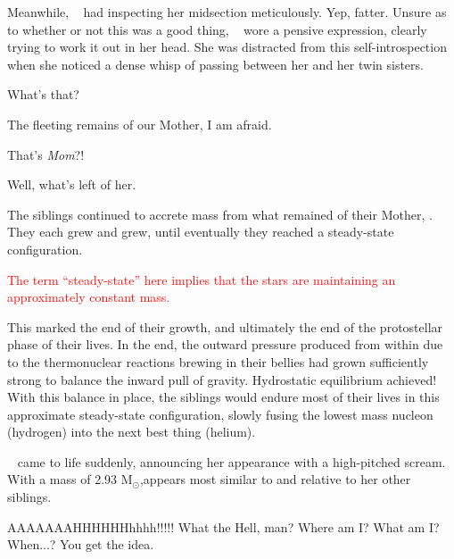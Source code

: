 \documentclass[main.tex]{subfiles}
\begin{document}
\par \nar Meanwhile, \rmcelaeno~ had inspecting her midsection meticulously.  Yep, fatter.  Unsure as to whether or not this was a good thing, \rmcelaeno~ wore a pensive expression, clearly trying to work it out in her head.  She was distracted from this self-introspection when she noticed a dense whisp of \Pleione passing between her and her twin sisters.  

\par \Celaeno What's that?

\par \Maia The fleeting remains of our Mother, I am afraid.

\par \Electra That's \textit{Mom}?!

\par \Maia Well, what's left of her.

\par \nar The siblings continued to accrete mass from what remained of their Mother, \rmpleione.  They each grew and grew, until eventually they reached a steady-state configuration.

\begin{tcolorbox}[sharp corners, colback=red!30, colframe=red!80!blue, title=Steady-State]
\par \textcolor{red} {The term ``steady-state'' here implies that the stars are maintaining an approximately constant mass.} 
\end{tcolorbox}

\par \nar This marked the end of their growth, and ultimately the end of the protostellar phase of their lives.  In the end, the outward pressure produced from within due to the thermonuclear reactions brewing in their bellies had grown sufficiently strong to balance the inward pull of gravity.  Hydrostatic equilibrium achieved!  With this balance in place, the siblings would endure most of their lives in this approximate steady-state configuration, slowly fusing the lowest mass nucleon (hydrogen) into the next best thing (helium).

\par \nar \rmsterope~ came to life suddenly, announcing her appearance with a high-pitched scream.  With a mass of 2.93 M$_{\odot}$,\rmsterope appears most similar to \rmtaygete and \rmalcyone relative to her other siblings.

\par \Sterope AAAAAAAHHHHHHhhhh!!!!!  What the Hell, man?  Where am I?  What am I?  When...?  You get the idea.
\end{document}
